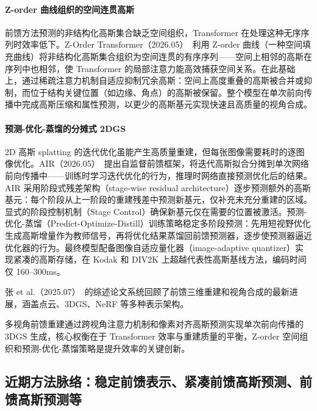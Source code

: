 \paragraph{Z-order 曲线组织的空间连贯高斯}

前馈方法预测的非结构化高斯集合缺乏空间组织，Transformer 在处理这种无序序列时效率低下。Z-Order Transformer（2026.05）~\cite{2605_13465}利用 Z-order 曲线（一种空间填充曲线）将非结构化高斯集合组织为空间连贯的有序序列——空间上相邻的高斯在序列中也相邻，使 Transformer 的局部注意力能高效捕获空间关系。在此基础上，通过稀疏注意力机制自适应抑制冗余高斯：空间上高度重叠的高斯被合并或抑制，而位于结构关键位置（如边缘、角点）的高斯被保留。整个模型在单次前向传播中完成高斯压缩和属性预测，以更少的高斯基元实现快速且高质量的视角合成。

\paragraph{预测-优化-蒸馏的分摊式 2DGS}

2D 高斯 splatting 的迭代优化虽能产生高质量重建，但每张图像需要耗时的逐图像优化。AIR（2026.05）~\cite{2605_20820}提出自监督前馈框架，将迭代高斯拟合分摊到单次网络前向传播中——训练时学习迭代优化的行为，推理时网络直接预测优化后的结果。AIR 采用阶段式残差架构（stage-wise residual architecture）逐步预测额外的高斯基元：每个阶段从上一阶段的重建残差中预测新基元，仅补充未充分重建的区域。显式的阶段控制机制（Stage Control）确保新基元仅在需要的位置被激活。预测-优化-蒸馏（Predict-Optimize-Distill）训练策略稳定多阶段预测：先用短视野优化生成高斯增量作为教师信号，再将优化结果蒸馏回前馈预测器，逐步使预测器逼近优化器的行为。最终模型配备图像自适应量化器（image-adaptive quantizer）实现紧凑的高斯存储，在 Kodak 和 DIV2K 上超越代表性高斯基线方法，编码时间仅 160--300ms。

张 et al.（2025.07）~\cite{2507_14501}的综述论文系统回顾了前馈三维重建和视角合成的最新进展，涵盖点云、3DGS、NeRF 等多种表示架构。

\begin{takeaway}
多视角前馈重建通过跨视角注意力机制和像素对齐高斯预测实现单次前向传播的 3DGS 生成，核心权衡在于 Transformer 效率与重建质量的平衡，Z-order 空间组织和预测-优化-蒸馏策略是提升效率的关键创新。
\end{takeaway}


\subsection{近期方法脉络：稳定前馈表示、紧凑前馈高斯预测、前馈高斯预测等}

